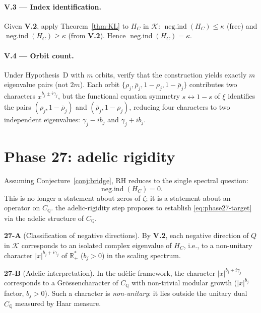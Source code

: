 \documentclass[11pt]{amsart}
\newcommand{\kap}{\kappa}
\newcommand{\negind}{\operatorname{neg.ind}}
\newcommand{\CQ}{C_{\mathbb{Q}}}
\newcommand{\Kcal}{\mathcal{K}}
\begin{document}
\medskip
\paragraph{\textbf{V.3} — Index identification.}
Given \textbf{V.2}, apply Theorem~\ref{thm:KL} to $H_C$ in $\Kcal$:
$\negind(H_C) \le \kap$ (free) and $\negind(H_C) \ge \kap$ (from \textbf{V.2}).
Hence $\negind(H_C) = \kap$.

\medskip
\paragraph{\textbf{V.4} — Orbit count.}
Under Hypothesis~D with $m$ orbits, verify that the construction yields exactly $m$
eigenvalue pairs (not $2m$).  Each orbit $\{\rho_j, \bar\rho_j, 1-\rho_j, 1-\bar\rho_j\}$
contributes two characters $x^{b_j \pm i\gamma_j}$, but the functional equation symmetry
$s \leftrightarrow 1-s$ of $\xi$ identifies the pairs $(\rho_j, 1-\bar\rho_j)$ and
$(\bar\rho_j, 1-\rho_j)$, reducing four characters to two independent eigenvalues:
$\gamma_j - ib_j$ and $\gamma_j + ib_j$.

\section{Phase 27: adelic rigidity}
\label{sec:phase27}

Assuming Conjecture~\ref{conj:bridge}, RH reduces to the single spectral question:
\begin{equation}\label{eq:phase27-target}
  \negind(H_C) = 0.
\end{equation}
This is no longer a statement about zeros of $\zeta$; it is a statement about an
operator on $\CQ$.  the adelic-rigidity step proposes to establish \eqref{eq:phase27-target} via the
adelic structure of $\CQ$.

\medskip
\textbf{27-A} (Classification of negative directions).  By \textbf{V.2}, each negative
direction of $Q$ in $\Kcal$ corresponds to an isolated complex eigenvalue of $H_C$,
i.e., to a non-unitary character $|x|^{b_j+i\gamma_j}$ of $\mathbb{R}^*_+$
($b_j > 0$) in the scaling spectrum.

\medskip
\textbf{27-B} (Adelic interpretation).  In the adèlic framework, the character
$|x|^{b_j+i\gamma_j}$ corresponds to a Gr\"ossencharacter of $\CQ$ with non-trivial
modular growth ($|x|^{b_j}$ factor, $b_j > 0$).  Such a character is \emph{non-unitary}:
it lies outside the unitary dual $\widehat\CQ$ measured by Haar measure.
\end{document}
